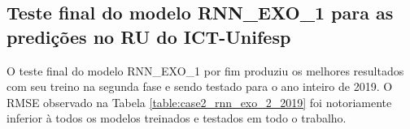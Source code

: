            
                  \begin{figure}[H]
                    \end{figure} 

   

            
            
      
           
           
            \begin{figure}[H]
            \end{figure}
           
           
           
                
                
                
    \subsection{Teste final do modelo RNN\_EXO\_1 para as predições no RU do ICT-Unifesp}
    
     O teste final do modelo RNN\_EXO\_1 por fim produziu os melhores resultados com seu treino na segunda fase e sendo testado para o ano inteiro de 2019. O RMSE observado na Tabela \ref{table:case2_rnn_exo_2_2019} foi notoriamente inferior à todos os modelos treinados e testados em todo o trabalho.
     
